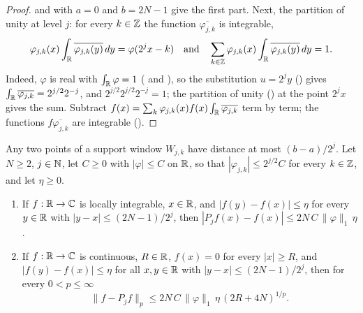 \begin{proof}
\leanok
{}
 and  with $a = 0$ and $b = 2N - 1$ give
the first part. Next, the partition of unity at level $j$: for every $k \in \mathbb{Z}$ the function
$\overline{\varphi_{j,k}}$ is integrable,
\[
  \varphi_{j,k}(x) \int_{\mathbb{R}} \overline{\varphi_{j,k}(y)} \, dy = \varphi(2^j x - k)
  \quad\text{and}\quad
  \sum_{k \in \mathbb{Z}} \varphi_{j,k}(x) \int_{\mathbb{R}} \overline{\varphi_{j,k}(y)} \, dy = 1 .
\]
Indeed, $\varphi$ is real with $\int_{\mathbb{R}} \varphi = 1$
( and ), so the substitution $u = 2^j y$
() gives $\int_{\mathbb{R}} \overline{\varphi_{j,k}} = 2^{j/2} 2^{-j}$,
and $2^{j/2} 2^{j/2} 2^{-j} = 1$; the partition of unity () at
the point $2^j x$ gives the sum. Subtract
$f(x) = \sum_k \varphi_{j,k}(x) f(x) \int_{\mathbb{R}} \overline{\varphi_{j,k}}$ term by term; the
functions $f \overline{\varphi_{j,k}}$ are integrable ().
\end{proof}

\begin{proposition}
\label{prop:daub-proj-error}
\leanok
{}
Any two points of a support window $W_{j,k}$ have distance at most $(b - a)/2^j$. Let $N \geq 2$,
$j \in \mathbb{N}$, let $C \geq 0$ with $|\varphi| \leq C$ on $\mathbb{R}$, so that
$|\varphi_{j,k}| \leq 2^{j/2} C$ for every $k \in \mathbb{Z}$, and let $\eta \geq 0$.
\begin{enumerate}
  \item If $f : \mathbb{R} \to \mathbb{C}$ is locally integrable, $x \in \mathbb{R}$, and $|f(y) - f(x)| \leq \eta$ for
    every $y \in \mathbb{R}$ with $|y - x| \leq (2N - 1)/2^j$, then
    $|P_j f(x) - f(x)| \leq 2N \, C \, \|\varphi\|_1 \, \eta$.
  \item If $f : \mathbb{R} \to \mathbb{C}$ is continuous, $R \in \mathbb{R}$, $f(x) = 0$ for every $|x| \geq R$, and
    $|f(y) - f(x)| \leq \eta$ for all $x, y \in \mathbb{R}$ with $|y - x| \leq (2N - 1)/2^j$, then for
    every $0 < p \leq \infty$
    \[
      \|f - P_j f\|_p \leq 2N \, C \, \|\varphi\|_1 \, \eta \, (2R + 4N)^{1/p} .
    \]
\end{enumerate}
\end{proposition}

